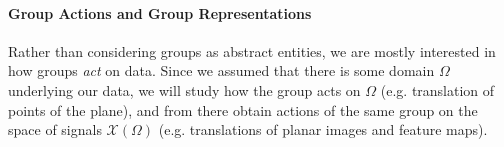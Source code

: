 
\paragraph{Group Actions and Group Representations}
%
Rather than considering groups as abstract entities, 
we are mostly interested in how groups \emph{act} on data.
%
Since we assumed that there is some domain $\Omega$ underlying our data, we will study how the group acts on $\Omega$ 
(e.g. translation of points of the plane), and from there obtain actions of the same group on the space of signals $\mathcal{X}(\Omega)$
(e.g. translations of planar images and feature maps). 



